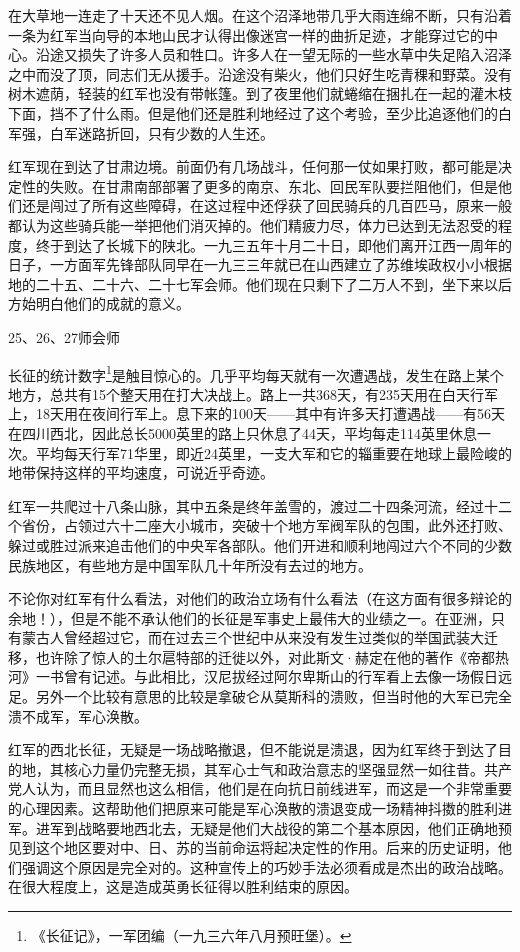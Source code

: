 \documentclass[10pt]{book}
\begin{document}
在大草地一连走了十天还不见人烟。在这个沼泽地带几乎大雨连绵不断，只有沿着一条为红军当向导的本地山民才认得出像迷宫一样的曲折足迹，才能穿过它的中心。沿途又损失了许多人员和牲口。许多人在一望无际的一些水草中失足陷入沼泽之中而没了顶，同志们无从援手。沿途没有柴火，他们只好生吃青稞和野菜。没有树木遮荫，轻装的红军也没有带帐篷。到了夜里他们就蜷缩在捆扎在一起的灌木枝下面，挡不了什么雨。但是他们还是胜利地经过了这个考验，至少比追逐他们的白军强，白军迷路折回，只有少数的人生还。

红军现在到达了甘肃边境。前面仍有几场战斗，任何那一仗如果打败，都可能是决定性的失败。在甘肃南部部署了更多的南京、东北、回民军队要拦阻他们，但是他们还是闯过了所有这些障碍，在这过程中还俘获了回民骑兵的几百匹马，原来一般都认为这些骑兵能一举把他们消灭掉的。他们精疲力尽，体力已达到无法忍受的程度，终于到达了长城下的陕北。一九三五年十月二十日，即他们离开江西一周年的日子，一方面军先锋部队同早在一九三三年就已在山西建立了苏维埃政权小小根据地的二十五、二十六、二十七军会师。他们现在只剩下了二万人不到，坐下来以后方始明白他们的成就的意义。

25、26、27师会师

长征的统计数字\footnote{《长征记》，一军团编（一九三六年八月预旺堡）。}是触目惊心的。几乎平均每天就有一次遭遇战，发生在路上某个地方，总共有15个整天用在打大决战上。路上一共368天，有235天用在白天行军上，18天用在夜间行军上。息下来的100天——其中有许多天打遭遇战——有56天在四川西北，因此总长5000英里的路上只休息了44天，平均每走114英里休息一次。平均每天行军71华里，即近24英里，一支大军和它的辎重要在地球上最险峻的地带保持这样的平均速度，可说近乎奇迹。

红军一共爬过十八条山脉，其中五条是终年盖雪的，渡过二十四条河流，经过十二个省份，占领过六十二座大小城市，突破十个地方军阀军队的包围，此外还打败、躲过或胜过派来追击他们的中央军各部队。他们开进和顺利地闯过六个不同的少数民族地区，有些地方是中国军队几十年所没有去过的地方。

不论你对红军有什么看法，对他们的政治立场有什么看法（在这方面有很多辩论的余地！），但是不能不承认他们的长征是军事史上最伟大的业绩之一。在亚洲，只有蒙古人曾经超过它，而在过去三个世纪中从来没有发生过类似的举国武装大迁移，也许除了惊人的土尔扈特部的迁徙以外，对此斯文·赫定在他的著作《帝都热河》一书曾有记述。与此相比，汉尼拔经过阿尔卑斯山的行军看上去像一场假日远足。另外一个比较有意思的比较是拿破仑从莫斯科的溃败，但当时他的大军已完全溃不成军，军心涣散。

红军的西北长征，无疑是一场战略撤退，但不能说是溃退，因为红军终于到达了目的地，其核心力量仍完整无损，其军心士气和政治意志的坚强显然一如往昔。共产党人认为，而且显然也这么相信，他们是在向抗日前线进军，而这是一个非常重要的心理因素。这帮助他们把原来可能是军心涣散的溃退变成一场精神抖擞的胜利进军。进军到战略要地西北去，无疑是他们大战役的第二个基本原因，他们正确地预见到这个地区要对中、日、苏的当前命运将起决定性的作用。后来的历史证明，他们强调这个原因是完全对的。这种宣传上的巧妙手法必须看成是杰出的政治战略。在很大程度上，这是造成英勇长征得以胜利结束的原因。
\end{document}
